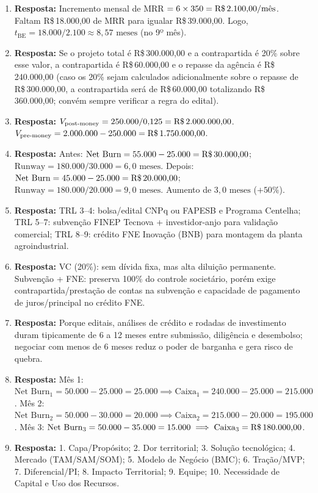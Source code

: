 \begin{boxGabarito}
\begin{enumerate}[leftmargin=1.5em, itemsep=4pt]
    \item \textbf{Resposta:} Incremento mensal de MRR $= 6 \times 350 = \text{R\$\,2.100,00/mês}$. Faltam R\$\,18.000,00 de MRR para igualar R\$\,39.000,00. Logo, $t_{\text{BE}} = 18.000 / 2.100 \approx 8{,}57\text{ meses}$ (no 9º mês).
    \item \textbf{Resposta:} Se o projeto total é R\$\,300.000,00 e a contrapartida é 20\% sobre esse valor, a contrapartida é R\$\,60.000,00 e o repasse da agência é R\$\,240.000,00 (caso os 20\% sejam calculados adicionalmente sobre o repasse de R\$\,300.000,00, a contrapartida será de R\$\,60.000,00 totalizando R\$\,360.000,00; convém sempre verificar a regra do edital).
    \item \textbf{Resposta:} $V_{\text{post-money}} = 250.000 / 0{,}125 = \text{R\$\,2.000.000,00}$. $V_{\text{pre-money}} = 2.000.000 - 250.000 = \text{R\$\,1.750.000,00}$.
    \item \textbf{Resposta:} Antes: $\text{Net Burn} = 55.000 - 25.000 = \text{R\$\,30.000,00}$; $\text{Runway} = 180.000 / 30.000 = 6{,}0\text{ meses}$. Depois: $\text{Net Burn} = 45.000 - 25.000 = \text{R\$\,20.000,00}$; $\text{Runway} = 180.000 / 20.000 = 9{,}0\text{ meses}$. Aumento de $3{,}0\text{ meses}$ ($+50\%$).
    \item \textbf{Resposta:} TRL 3–4: bolsa/edital CNPq ou FAPESB e Programa Centelha; TRL 5–7: subvenção FINEP Tecnova + investidor-anjo para validação comercial; TRL 8–9: crédito FNE Inovação (BNB) para montagem da planta agroindustrial.
    \item \textbf{Resposta:} VC (20\%): sem dívida fixa, mas alta diluição permanente. Subvenção + FNE: preserva 100\% do controle societário, porém exige contrapartida/prestação de contas na subvenção e capacidade de pagamento de juros/principal no crédito FNE.
    \item \textbf{Resposta:} Porque editais, análises de crédito e rodadas de investimento duram tipicamente de 6 a 12 meses entre submissão, diligência e desembolso; negociar com menos de 6 meses reduz o poder de barganha e gera risco de quebra.
    \item \textbf{Resposta:} Mês 1: $\text{Net Burn}_1 = 50.000 - 25.000 = 25.000 \implies \text{Caixa}_1 = 240.000 - 25.000 = 215.000$. Mês 2: $\text{Net Burn}_2 = 50.000 - 30.000 = 20.000 \implies \text{Caixa}_2 = 215.000 - 20.000 = 195.000$. Mês 3: $\text{Net Burn}_3 = 50.000 - 35.000 = 15.000 \implies \text{Caixa}_3 = \text{R\$\,180.000,00}$.
    \item \textbf{Resposta:} 1. Capa/Propósito; 2. Dor territorial; 3. Solução tecnológica; 4. Mercado (TAM/SAM/SOM); 5. Modelo de Negócio (BMC); 6. Tração/MVP; 7. Diferencial/PI; 8. Impacto Territorial; 9. Equipe; 10. Necessidade de Capital e Uso dos Recursos.

\end{enumerate}
\end{boxGabarito}
